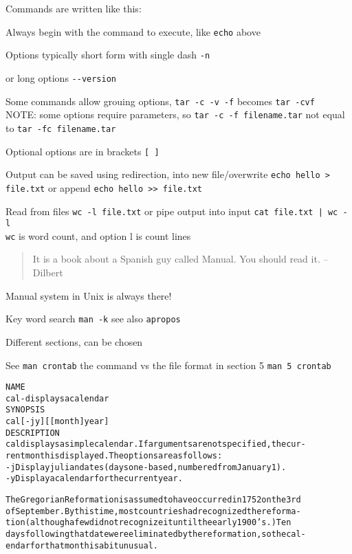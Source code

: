 \documentclass[Screen16to9,17pt]{foils}
\begin{document}
\begin{list1}
\item Commands are written like this:
\begin{list2}
\item Always begin with the command to execute, like \verb+echo+ above
\item Options typically short form with single dash \verb+-n+
\item or long options \verb+--version+
\item Some commands allow grouing options, \verb+tar -c -v -f+ becomes \verb+tar -cvf+\\
NOTE: some options require parameters, so \verb+tar -c -f filename.tar+ not equal to \verb+tar -fc filename.tar+
\item Optional options are in brackets \verb+[ ]+
\item Output can be saved using redirection, into new file/overwrite \verb+echo hello > file.txt+ or append \verb+echo hello >> file.txt+
\item Read from files \verb+wc -l file.txt+ or pipe output into input \verb+cat file.txt | wc -l+\\
\verb+wc+ is word count, and option l is count lines
\end{list2}
\end{list1}





\begin{quote}
 It is a book about a Spanish guy called Manual. You should read it.
       -- Dilbert
\end{quote}

\begin{list1}
\item Manual system in Unix is always there!
\item Key word search \verb+man -k+ see also \verb+apropos+
\item Different sections, can be chosen
\end{list1}

See \verb+man crontab+ the command vs the file format in section 5 \verb+man 5 crontab+




\begin{alltt}\footnotesize
\small
NAME
     cal - displays a calendar
SYNOPSIS
     cal [-jy] [[month]  year]
DESCRIPTION
   cal displays a simple calendar.  If arguments are not specified, the cur-
   rent month is displayed.  The options are as follows:
   -j      Display julian dates (days one-based, numbered from January 1).
   -y      Display a calendar for the current year.

The Gregorian Reformation is assumed to have occurred in 1752 on the 3rd
of September.  By this time, most countries had recognized the reforma-
tion (although a few did not recognize it until the early 1900's.)  Ten
days following that date were eliminated by the reformation, so the cal-
endar for that month is a bit unusual.
\end{alltt}
\end{document}
